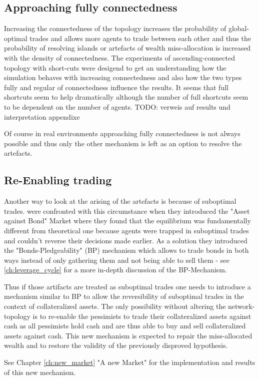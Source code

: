 \documentclass[Bachelorarbeit.tex]{subfiles}
\begin{document}
\subsection{Approaching fully connectedness}
Increasing the connectedness of the topology increases the probability of global-optimal trades and allows more agents to trade between each other and thus the probability of resolving islands or artefacts of wealth miss-allocation is increased with the density of connectedness.
The experiments of ascending-connected topology with short-cuts were desigend to get an understanding how the simulation behaves with increasing connectedness and also how the two types fully and regular of connectedness influence the results.
It seems that full shortcuts seem to help dramatically although the number of full shortcuts seem to be dependent on the number of agents.
TODO: verweis auf results und interpretation appendixe

Of course in real environments approaching fully connectedness is not always possible and thus only the other mechanism is left as an option to resolve the artefacts.

\subsection{Re-Enabling trading}
Another way to look at the arising of the artefacts is because of suboptimal trades. \cite{Breuer2015} were confronted with this circumstance when they introduced the "Asset against Bond" Market where they found that the equilibrium was fundamentally different from theoretical one because agents were trapped in suboptimal trades and couldn't reverse their decisions made earlier. As a solution they introduced the "Bonds-Pledgeability" (BP) mechanism which allows to trade bonds in both ways instead of only gathering them and not being able to sell them - see \ref{ch:leverage_cycle} for a more in-depth discussion of the BP-Mechanism.

\medskip 

Thus if those artifacts are treated as suboptimal trades one needs to introduce a mechanism similar to BP to allow the reversibility of suboptimal trades in the context of collateralized assets. The only possibility without altering the network-topology is to re-enable the pessimists to trade their collateralized assets against cash as all pessimists hold cash and are thus able to buy and sell collateralized assets against cash. This new mechanism is expected to repair the miss-allocated wealth and to restore the validity of the previously disproved hypothesis.

\medskip 

See Chapter \ref{ch:new_market} "A new Market" for the implementation and results of this new mechanism.
\end{document}
